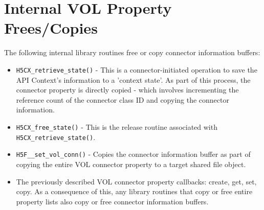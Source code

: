 \section{Internal VOL Property Frees/Copies}
\label{sec:internal-vol-property-ops}

The following internal library routines free or copy connector information buffers:

\begin{itemize}
    \item \texttt{H5CX\_retrieve\_state()} - This is a connector-initiated operation to save the API Context's information to a 'context state'. As part of this process, the connector property is directly copied - which involves incrementing the reference count of the connector class ID and copying the connector information.

    \item \texttt{H5CX\_free\_state()} - This is the release routine associated with  \texttt{H5CX\_retrieve\_state()}.

    \item \texttt{H5F\_\_set\_vol\_conn()} - Copies the connector information buffer as part of copying the entire VOL connector property to a target shared file object.

    \item The previously described VOL connector property callbacks: create, get, set, copy. As a consequence of this, any library routines that copy or free entire property lists also copy or free connector information buffers.
\end{itemize}